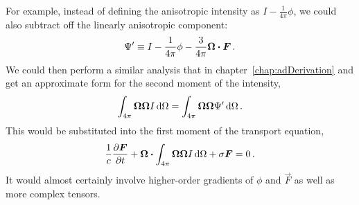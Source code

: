 For example, instead of defining the anisotropic intensity as $I -
\frac{1}{4\pi}\phi$, we could also subtract off the linearly anisotropic
component:
\begin{equation*}
  \Psi' \equiv I - \frac{1}{4\pi}\phi - \frac{3}{4\pi} \bm{\Omega} \bm{\cdot}
  \bm{F}\,.
\end{equation*}
We could then perform a similar analysis that in chapter~\ref{chap:adDerivation}
and get an approximate form for the second moment of the intensity,
\begin{equation*}
  \int_{4\pi} \bm{\Omega}\bm{\Omega} I \mathop{}\!\mathrm{d} \Omega
  = \int_{4\pi} \bm{\Omega}\bm{\Omega} \Psi' \mathop{}\!\mathrm{d} \Omega \,.
\end{equation*}
This would be substituted into the first moment of the transport equation,
\begin{equation*}
  \frac{1}{c}\frac{\partial \bm{F}}{\partial t}
  + \bm{\Omega} \bm{\cdot} \int_{4\pi} \bm{\Omega}\bm{\Omega} I \mathop{}\!\mathrm{d} \Omega
  + \sigma \bm{F}
  = 0 \,.
\end{equation*}
It would almost certainly involve higher-order gradients of $\phi$ and $\vec{F}$
as well as more complex tensors.

